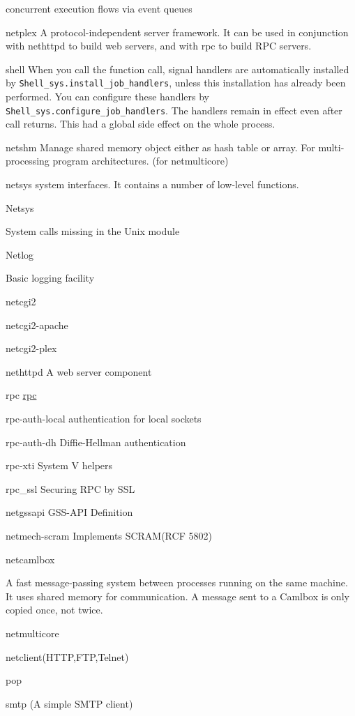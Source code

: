 concurrent execution flows via event queues 

netplex
A protocol-independent server framework. It can be used in conjunction
with nethttpd to build web servers, and with rpc to build RPC servers.

shell
When you call the function call, signal handlers are automatically
installed by \verb|Shell_sys.install_job_handlers|, unless this
installation has already been performed. You can configure these
handlers by \verb|Shell_sys.configure_job_handlers|. The handlers
remain in effect even after call returns. This had a global side
effect on the whole process.


netshm
Manage shared memory object either as hash table or array. For
multi-processing program architectures. (for netmulticore)

netsys
system interfaces. It contains a number of low-level functions.
\begin{enumerate}
Netsys 

System calls missing in the Unix module

Netlog

Basic logging facility
\end{enumerate}


netcgi2

netcgi2-apache

netcgi2-plex

nethttpd
A web server component 

rpc 
\href{http://blog.camlcity.org/blog/ocamlnet3_ha.html}{rpc}

rpc-auth-local
authentication for local sockets


rpc-auth-dh
Diffie-Hellman authentication


rpc-xti
System V helpers 


rpc_ssl
Securing RPC by SSL

netgssapi 
GSS-API Definition

netmech-scram
Implements SCRAM(RCF 5802)


netcamlbox 

A fast message-passing system between processes running on the same
machine. It uses shared memory for communication. A message sent to a
Camlbox is only copied once, not twice.

netmulticore


netclient(HTTP,FTP,Telnet)

pop

smtp (A simple SMTP client)



